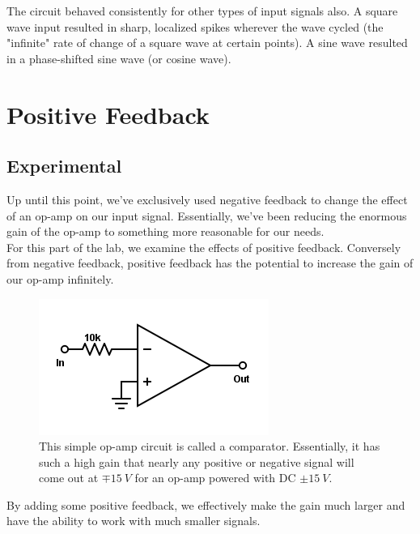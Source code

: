 \documentclass[11pt]{article}
\begin{document}
The circuit behaved consistently for other types of input signals also. A square wave input resulted in sharp, localized spikes wherever the wave cycled (the "infinite" rate of change of a square wave at certain points). A sine wave resulted in a phase-shifted sine wave (or cosine wave).\\


\section{Positive Feedback}
\subsection{Experimental}

Up until this point, we've exclusively used negative feedback to change the effect of an op-amp on our input signal. Essentially, we've been reducing the enormous gain of the op-amp to something more reasonable for our needs.\\

For this part of the lab, we examine the effects of positive feedback. Conversely from negative feedback, positive feedback has the potential to increase the gain of our op-amp infinitely.\\

\begin{figure}[H]
    \centering
    \includegraphics[scale=0.5]{Diagrams/c-e1.png}
    \caption{This simple op-amp circuit is called a comparator. Essentially, it has such a high gain that nearly any positive or negative signal will come out at $\mp 15\ V$ for an op-amp powered with DC $\pm 15\ V$.}
    \label{circuit:e1}
\end{figure}

By adding some positive feedback, we effectively make the gain much larger and have the ability to work with much smaller signals. \\
\end{document}
